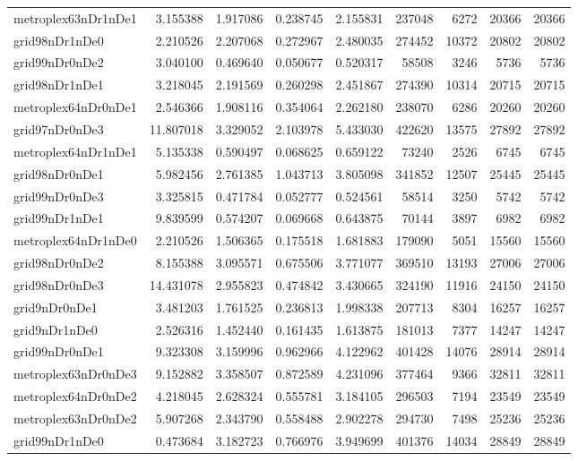 \begin{longtable}{|l|r|r|r|r|r|r|r|r|}
metroplex63nDr1nDe1 & 3.155388 & 1.917086 & 0.238745 & 2.155831 & 237048 & 6272 & 20366 & 20366 \\
grid98nDr1nDe0 & 2.210526 & 2.207068 & 0.272967 & 2.480035 & 274452 & 10372 & 20802 & 20802 \\
grid99nDr0nDe2 & 3.040100 & 0.469640 & 0.050677 & 0.520317 & 58508 & 3246 & 5736 & 5736 \\
grid98nDr1nDe1 & 3.218045 & 2.191569 & 0.260298 & 2.451867 & 274390 & 10314 & 20715 & 20715 \\
metroplex64nDr0nDe1 & 2.546366 & 1.908116 & 0.354064 & 2.262180 & 238070 & 6286 & 20260 & 20260 \\
grid97nDr0nDe3 & 11.807018 & 3.329052 & 2.103978 & 5.433030 & 422620 & 13575 & 27892 & 27892 \\
metroplex64nDr1nDe1 & 5.135338 & 0.590497 & 0.068625 & 0.659122 & 73240 & 2526 & 6745 & 6745 \\
grid98nDr0nDe1 & 5.982456 & 2.761385 & 1.043713 & 3.805098 & 341852 & 12507 & 25445 & 25445 \\
grid99nDr0nDe3 & 3.325815 & 0.471784 & 0.052777 & 0.524561 & 58514 & 3250 & 5742 & 5742 \\
grid99nDr1nDe1 & 9.839599 & 0.574207 & 0.069668 & 0.643875 & 70144 & 3897 & 6982 & 6982 \\
metroplex64nDr1nDe0 & 2.210526 & 1.506365 & 0.175518 & 1.681883 & 179090 & 5051 & 15560 & 15560 \\
grid98nDr0nDe2 & 8.155388 & 3.095571 & 0.675506 & 3.771077 & 369510 & 13193 & 27006 & 27006 \\
grid98nDr0nDe3 & 14.431078 & 2.955823 & 0.474842 & 3.430665 & 324190 & 11916 & 24150 & 24150 \\
grid9nDr0nDe1 & 3.481203 & 1.761525 & 0.236813 & 1.998338 & 207713 & 8304 & 16257 & 16257 \\
grid9nDr1nDe0 & 2.526316 & 1.452440 & 0.161435 & 1.613875 & 181013 & 7377 & 14247 & 14247 \\
grid99nDr0nDe1 & 9.323308 & 3.159996 & 0.962966 & 4.122962 & 401428 & 14076 & 28914 & 28914 \\
metroplex63nDr0nDe3 & 9.152882 & 3.358507 & 0.872589 & 4.231096 & 377464 & 9366 & 32811 & 32811 \\
metroplex64nDr0nDe2 & 4.218045 & 2.628324 & 0.555781 & 3.184105 & 296503 & 7194 & 23549 & 23549 \\
metroplex63nDr0nDe2 & 5.907268 & 2.343790 & 0.558488 & 2.902278 & 294730 & 7498 & 25236 & 25236 \\
grid99nDr1nDe0 & 0.473684 & 3.182723 & 0.766976 & 3.949699 & 401376 & 14034 & 28849 & 28849 \\

\end{longtable}
